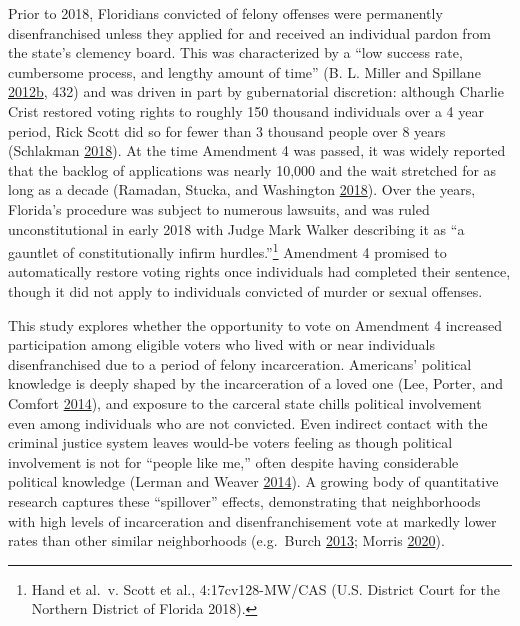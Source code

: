 \documentclass[
  12pt,
]{article}
\begin{document}
Prior to 2018, Floridians convicted of felony offenses were permanently disenfranchised unless they applied for and received an individual pardon from the state's clemency board. This was characterized by a ``low success rate, cumbersome process, and lengthy amount of time'' (B. L. Miller and Spillane \protect\hyperlink{ref-Miller2012a}{2012}\protect\hyperlink{ref-Miller2012a}{b}, 432) and was driven in part by gubernatorial discretion: although Charlie Crist restored voting rights to roughly 150 thousand individuals over a 4 year period, Rick Scott did so for fewer than 3 thousand people over 8 years (Schlakman \protect\hyperlink{ref-Schlakman2018}{2018}). At the time Amendment 4 was passed, it was widely reported that the backlog of applications was nearly 10,000 and the wait stretched for as long as a decade (Ramadan, Stucka, and Washington \protect\hyperlink{ref-Ramadan2018}{2018}). Over the years, Florida's procedure was subject to numerous lawsuits, and was ruled unconstitutional in early 2018 with Judge Mark Walker describing it as ``a gauntlet of constitutionally infirm hurdles.''\footnote{Hand et al.~v. Scott et al., 4:17cv128-MW/CAS (U.S. District Court for the Northern District of Florida 2018).} Amendment 4 promised to automatically restore voting rights once individuals had completed their sentence, though it did not apply to individuals convicted of murder or sexual offenses.

This study explores whether the opportunity to vote on Amendment 4 increased participation among eligible voters who lived with or near individuals disenfranchised due to a period of felony incarceration. Americans' political knowledge is deeply shaped by the incarceration of a loved one (Lee, Porter, and Comfort \protect\hyperlink{ref-Lee2014}{2014}), and exposure to the carceral state chills political involvement even among individuals who are not convicted. Even indirect contact with the criminal justice system leaves would-be voters feeling as though political involvement is not for ``people like me,'' often despite having considerable political knowledge (Lerman and Weaver \protect\hyperlink{ref-Lerman2014}{2014}). A growing body of quantitative research captures these ``spillover'' effects, demonstrating that neighborhoods with high levels of incarceration and disenfranchisement vote at markedly lower rates than other similar neighborhoods (e.g.~Burch \protect\hyperlink{ref-Burch2013}{2013}; Morris \protect\hyperlink{ref-Morris2020}{2020}).
\end{document}

